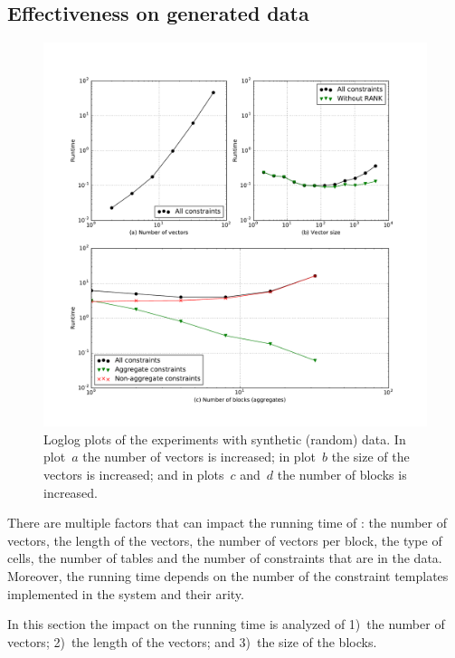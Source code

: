 \subsection{Effectiveness on generated data}

\begin{figure}[t]
  \centering
  \includegraphics[width=1\linewidth]{figures/scatter_plots.pdf}
  \caption{Loglog plots of the experiments with synthetic (random) data. In plot~$a$ the number of vectors is increased; in plot~$b$ the size of the vectors is increased; and in plots~$c$ and~$d$ the number of blocks is increased.}
  \label{fig:runtime_analysis}
\end{figure}

There are multiple factors that can impact the running time of \sname: the number of vectors, the length of the vectors, the number of vectors per block, the type of cells, the number of tables and the number of constraints that are in the data.
Moreover, the running time depends on the number of the constraint templates implemented in the system and their arity.

In this section the impact on the running time is analyzed of 1)~the number of vectors; 2)~the length of the vectors; and 3)~the size of the blocks. 

